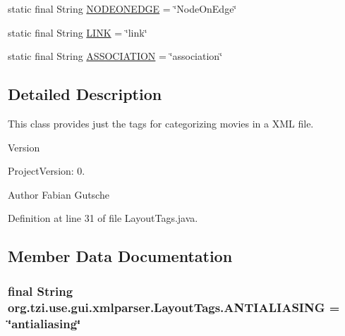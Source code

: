 \begin{DoxyCompactItemize}
\item 
static final String \hyperlink{classorg_1_1tzi_1_1use_1_1gui_1_1xmlparser_1_1_layout_tags_a7ea68bdd3ad0a495b13864777ac5e3f7}{N\-O\-D\-E\-O\-N\-E\-D\-G\-E} = \char`\"{}Node\-On\-Edge\char`\"{}
\item 
static final String \hyperlink{classorg_1_1tzi_1_1use_1_1gui_1_1xmlparser_1_1_layout_tags_a348310317c2c24fc6485ccea29ba681c}{L\-I\-N\-K} = \char`\"{}link\char`\"{}
\item 
static final String \hyperlink{classorg_1_1tzi_1_1use_1_1gui_1_1xmlparser_1_1_layout_tags_a5c756ec1a155b335f202f35f2391a4f2}{A\-S\-S\-O\-C\-I\-A\-T\-I\-O\-N} = \char`\"{}association\char`\"{}
\end{DoxyCompactItemize}


\subsection{Detailed Description}
This class provides just the tags for categorizing movies in a X\-M\-L file.

\begin{DoxyVersion}{Version}

\end{DoxyVersion}
\begin{DoxyParagraph}{Project\-Version\-:}
0. 
\end{DoxyParagraph}
\begin{DoxyAuthor}{Author}
Fabian Gutsche 
\end{DoxyAuthor}


Definition at line 31 of file Layout\-Tags.\-java.



\subsection{Member Data Documentation}
\hypertarget{classorg_1_1tzi_1_1use_1_1gui_1_1xmlparser_1_1_layout_tags_ae27519a89f293c74a4d06b91b3063917}{
\subsubsection[{A\-N\-T\-I\-A\-L\-I\-A\-S\-I\-N\-G}]{\setlength{\rightskip}{0pt plus 5cm}final String org.\-tzi.\-use.\-gui.\-xmlparser.\-Layout\-Tags.\-A\-N\-T\-I\-A\-L\-I\-A\-S\-I\-N\-G = \char`\"{}antialiasing\char`\"{}\hspace{0.3cm}{\ttfamily [static]}}}\label{classorg_1_1tzi_1_1use_1_1gui_1_1xmlparser_1_1_layout_tags_ae27519a89f293c74a4d06b91b3063917}


